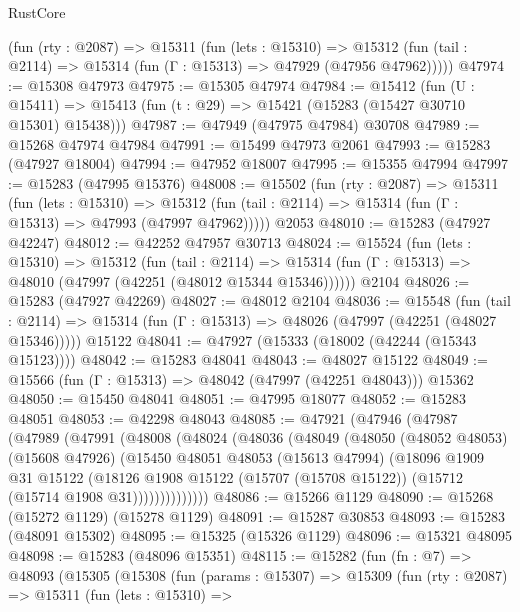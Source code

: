 \begin{lexlean}{RustCore}
\begin{coremodule}
    (fun (rty : @2087) =>
    @15311
      (fun (lets : @15310) =>
      @15312 (fun (tail : @2114) => @15314 (fun (Γ : @15313) => @47929 (@47956 @47962)))))
@47974 := @15308 @47973
@47975 := @15305 @47974
@47984 := @15412
    (fun (U : @15411) => @15413 (fun (t : @29) => @15421 (@15283 (@15427 @30710 @15301) @15438)))
@47987 := @47949 (@47975 @47984) @30708
@47989 := @15268 @47974 @47984
@47991 := @15499 @47973 @2061
@47993 := @15283 (@47927 @18004)
@47994 := @47952 @18007
@47995 := @15355 @47994
@47997 := @15283 (@47995 @15376)
@48008 := @15502
    (fun (rty : @2087) =>
    @15311
      (fun (lets : @15310) =>
      @15312 (fun (tail : @2114) => @15314 (fun (Γ : @15313) => @47993 (@47997 @47962)))))
    @2053
@48010 := @15283 (@47927 @42247)
@48012 := @42252 @47957 @30713
@48024 := @15524
    (fun (lets : @15310) =>
    @15312
      (fun (tail : @2114) =>
      @15314 (fun (Γ : @15313) => @48010 (@47997 (@42251 (@48012 @15344 @15346))))))
    @2104
@48026 := @15283 (@47927 @42269)
@48027 := @48012 @2104
@48036 := @15548
    (fun (tail : @2114) => @15314 (fun (Γ : @15313) => @48026 (@47997 (@42251 (@48027 @15346)))))
    @15122
@48041 := @47927 (@15333 (@18002 (@42244 (@15343 @15123))))
@48042 := @15283 @48041
@48043 := @48027 @15122
@48049 := @15566 (fun (Γ : @15313) => @48042 (@47997 (@42251 @48043))) @15362
@48050 := @15450 @48041
@48051 := @47995 @18077
@48052 := @15283 @48051
@48053 := @42298 @48043
@48085 := @47921
    (@47946
      (@47987
        (@47989
          (@47991
            (@48008
              (@48024
                (@48036
                  (@48049
                    (@48050
                      (@48052 @48053)
                      (@15608 @47926)
                      (@15450
                        @48051
                        @48053
                        (@15613 @47994)
                        (@18096
                          @1909
                          @31
                          @15122
                          (@18126
                            @1908
                            @15122
                            (@15707 (@15708 @15122))
                            (@15712 (@15714 @1908 @31))))))))))))))
@48086 := @15266 @1129
@48090 := @15268 (@15272 @1129) (@15278 @1129)
@48091 := @15287 @30853
@48093 := @15283 (@48091 @15302)
@48095 := @15325 (@15326 @1129)
@48096 := @15321 @48095
@48098 := @15283 (@48096 @15351)
@48115 := @15282
    (fun (fn : @7) =>
    @48093
      (@15305
        (@15308
          (fun (params : @15307) =>
          @15309
            (fun (rty : @2087) =>
            @15311
              (fun (lets : @15310) =>

\end{coremodule}
\end{lexlean}
